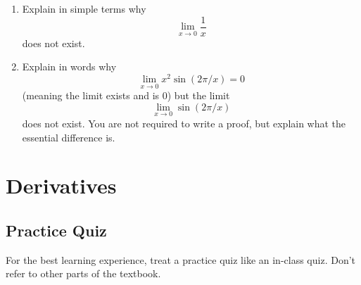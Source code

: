 \documentclass[11pt]{book}
\begin{document}
\begin{enumerate}
\begin{enumerate}
\end{enumerate}

\item

Explain in simple terms why $$\lim_{x\to 0} \frac{1}{x}$$ does not exist.  



\item
Explain in words why $$\lim_{x\to 0} x^2 \sin(2\pi/x)=0$$ (meaning the limit exists and is 0) but the limit $$\lim_{x\to 0} \sin(2\pi/x)$$ does not exist.  You are not required to write a proof, but explain what the essential difference is.









\end{enumerate}




\chapter{Derivatives}  


\section{Practice Quiz}

For the best learning experience, treat a practice quiz like an in-class quiz. Don't refer to other parts of the textbook.
\end{document}
